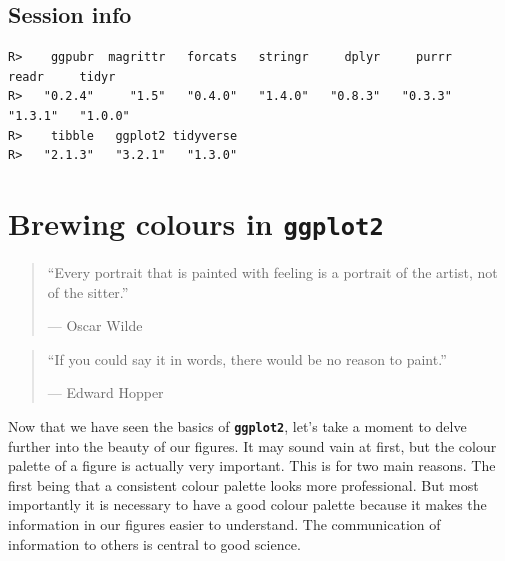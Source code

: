 \documentclass[
]{book}
\newenvironment{Shaded}{\begin{snugshade}}{\end{snugshade}}
\newcommand{\KeywordTok}[1]{\textcolor[rgb]{0.13,0.29,0.53}{\textbf{#1}}}
\newcommand{\NormalTok}[1]{#1}
\newcommand{\OperatorTok}[1]{\textcolor[rgb]{0.81,0.36,0.00}{\textbf{#1}}}
\newcommand{\StringTok}[1]{\textcolor[rgb]{0.31,0.60,0.02}{#1}}
\begin{document}
\hypertarget{session-info-4}{%
\section{Session info}\label{session-info-4}}

\begin{Shaded}
\end{Shaded}

\begin{verbatim}
R>    ggpubr  magrittr   forcats   stringr     dplyr     purrr     readr     tidyr 
R>   "0.2.4"     "1.5"   "0.4.0"   "1.4.0"   "0.8.3"   "0.3.3"   "1.3.1"   "1.0.0" 
R>    tibble   ggplot2 tidyverse 
R>   "2.1.3"   "3.2.1"   "1.3.0"
\end{verbatim}

\hypertarget{brewing}{%
\chapter{\texorpdfstring{Brewing colours in \textbf{\texttt{ggplot2}}}{Brewing colours in ggplot2}}\label{brewing}}

\begin{quote}
``Every portrait that is painted with feeling is a portrait of the artist, not of the sitter.''

--- Oscar Wilde
\end{quote}

\begin{quote}
``If you could say it in words, there would be no reason to paint.''

--- Edward Hopper
\end{quote}

Now that we have seen the basics of \textbf{\texttt{ggplot2}}, let's take a moment to delve further into the beauty of our figures. It may sound vain at first, but the colour palette of a figure is actually very important. This is for two main reasons. The first being that a consistent colour palette looks more professional. But most importantly it is necessary to have a good colour palette because it makes the information in our figures easier to understand. The communication of information to others is central to good science.
\end{document}
